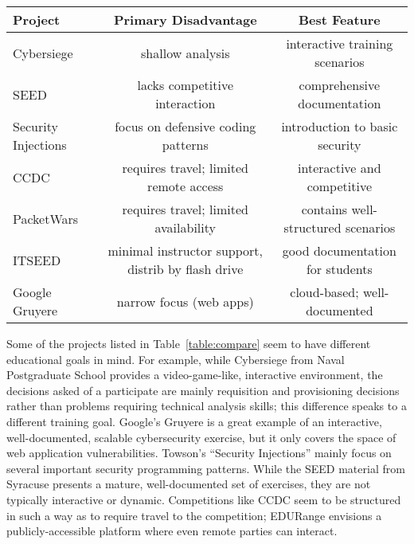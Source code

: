 \begin{table*}[ht]
  \caption{{\em A Summary Comparison of EDURange and Existing Projects.}
      EDURange focuses on developing analytical skills and understanding
      system and network failure modes. The table below is not a criticism
      of existing efforts, but meant to highlight the ways in which our
      plans for EDURange differ from the characteristics of existing
      projects -- these projects may have been built with different
      criteria in mind.}
  \begin{center}
    \begin{tabular}{|l||c|c|}
    \hline
    {\bf Project} & {\bf Primary Disadvantage} & {\bf Best Feature} \\
    \hline
     Cybersiege & shallow analysis
                & interactive training scenarios\\
    \hline
     SEED & lacks competitive interaction
          & comprehensive documentation\\
    \hline
     Security Injections & focus on defensive coding patterns
                         & introduction to basic security\\
    \hline
     CCDC & requires travel; limited remote access
          & interactive and competitive\\
    \hline
     PacketWars & requires travel; limited availability
                & contains well-structured scenarios\\
    \hline
    ITSEED & minimal instructor support, distrib by flash drive
              & good documentation for students\\
    \hline
     Google Gruyere & narrow focus (web apps)
                    & cloud-based; well-documented\\
    \hline
    \end{tabular}
  \end{center}
  \label{table:compare}
\end{table*}



Some of the projects listed in Table~\ref{table:compare} seem to have
different educational goals in mind.  For example, while Cybersiege
from Naval Postgraduate School provides a video-game-like, interactive
environment, the decisions asked of a participate are mainly
requisition and provisioning decisions rather than problems requiring
technical analysis skills; this difference speaks to a different
training goal.  Google's Gruyere is a great example of an interactive,
well-documented, scalable cybersecurity exercise, but it only covers
the space of web application vulnerabilities.  Towson's ``Security
Injections'' mainly focus on several important security programming
patterns.  While the SEED material from Syracuse presents a mature,
well-documented set of exercises, they are not typically interactive
or dynamic.  Competitions like CCDC seem to be structured in such a
way as to require travel to the competition; EDURange envisions a
publicly-accessible platform where even remote parties can interact.


